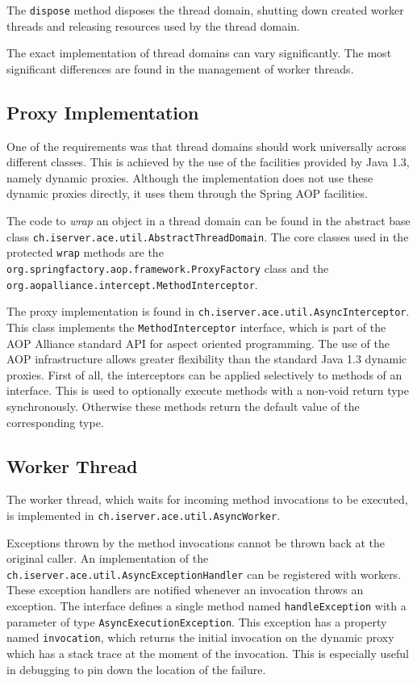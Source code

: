 The \texttt{dispose} method disposes the thread domain, shutting down 
created worker threads and releasing resources used by the thread domain.

The exact implementation of thread domains can vary significantly. The most 
significant differences are found in the management of worker threads.


\subsection{Proxy Implementation}
One of the requirements was that thread domains should work universally across
different classes. This is achieved by the use of the facilities provided by
Java 1.3, namely dynamic proxies. Although the implementation does not use
these dynamic proxies directly, it uses them through the Spring AOP facilities.

The code to \emph{wrap} an object in a thread domain can be found in the
abstract base class \texttt{ch.iserver.ace.util.AbstractThreadDomain}. The
core classes used in the protected \texttt{wrap} methods are the
\texttt{org.springfactory.aop.framework.ProxyFactory} class and the 
\texttt{org.aopalliance.intercept.MethodInterceptor}. 

The proxy implementation is found in 
\texttt{ch.iserver.ace.util.AsyncInterceptor}. This class implements the
\texttt{MethodInterceptor} interface, which is part of the AOP Alliance
standard API for aspect oriented programming. The use of the AOP 
infrastructure allows greater flexibility than the standard Java 1.3 dynamic
proxies. First of all, the interceptors can be applied selectively to
methods of an interface. This is used to optionally execute methods with 
a non-void return type synchronously. Otherwise these methods return
the default value of the corresponding type.


\subsection{Worker Thread}
The worker thread, which waits for incoming method invocations to be
executed, is implemented in \texttt{ch.\-iserver.\-ace.\-util.\-AsyncWorker}.

Exceptions thrown by the method invocations cannot be thrown back at the
original caller. An implementation of the 
\texttt{ch.\-iserver.\-ace.\-util.\-AsyncExceptionHandler} can be 
registered with
workers. These exception handlers are notified whenever an invocation
throws an exception. The interface defines a single method named
\texttt{handleException} with a parameter of type 
\texttt{Async\-Execution\-Exception}. This exception has a property named
\texttt{invocation}, which returns the initial invocation on the dynamic
proxy which has a stack trace at the moment of the invocation. This is
especially useful in debugging to pin down the location of the failure.


